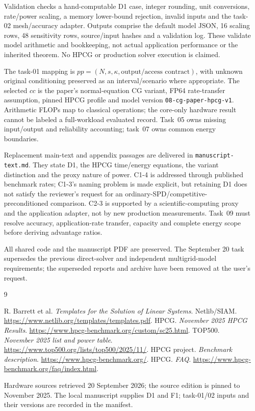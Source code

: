 \documentclass[11pt,a4paper]{article}
\begin{document}
Validation checks a hand-computable D1 case, integer rounding, unit conversions, rate/power scaling, a memory lower-bound rejection, invalid inputs and the task-02 mesh/accuracy adapter. Outputs comprise the default model JSON, 16 scaling rows, 48 sensitivity rows, source/input hashes and a validation log. These validate model arithmetic and bookkeeping, not actual application performance or the inherited theorem. No HPCG or production solver execution is claimed.

The task-01 mapping is $pp=(N,s,\kappa,\text{output/access contract})$, with unknown original conditioning preserved as an interval/scenario where appropriate. The selected $cc$ is the paper's normal-equation CG variant, FP64 rate-transfer assumption, pinned HPCG profile and model version \texttt{08-cg-paper-hpcg-v1}. Arithmetic FLOPs map to classical operations; the core-only hardware result cannot be labeled a full-workload evaluated record. Task~05 owns missing input/output and reliability accounting; task~07 owns common energy boundaries.

Replacement main-text and appendix passages are delivered in \texttt{manuscript-text.md}. They state D1, the HPCG time/energy equations, the variant distinction and the proxy nature of power. C1-4 is addressed through published benchmark rates; C1-3's naming problem is made explicit, but retaining D1 does not satisfy the reviewer's request for an ordinary-SPD/competitive-preconditioned comparison. C2-3 is supported by a scientific-computing proxy and the application adapter, not by new production measurements. Task~09 must resolve accuracy, application-rate transfer, capacity and complete energy scope before deriving advantage ratios.

All shared code and the manuscript PDF are preserved. The September 20 task supersedes the previous direct-solver and independent multigrid-model requirements; the superseded reports and archive have been removed at the user's request.

\begin{thebibliography}{9}\small\raggedright
{} R. Barrett et al. \emph{Templates for the Solution of Linear Systems}. Netlib/SIAM. \url{https://www.netlib.org/templates/templates.pdf}.
 HPCG. \emph{November 2025 HPCG Results}. \url{https://www.hpcg-benchmark.org/custom/sc25.html}.
 TOP500. \emph{November 2025 list and power table}. \url{https://www.top500.org/lists/top500/2025/11/}.
 HPCG project. \emph{Benchmark description}. \url{https://www.hpcg-benchmark.org/}.
 HPCG. \emph{FAQ}. \url{https://www.hpcg-benchmark.org/faq/index.html}.
\end{thebibliography}
Hardware sources retrieved 20 September 2026; the source edition is pinned to November 2025. The local manuscript supplies D1 and F1; task-01/02 inputs and their versions are recorded in the manifest.
\end{document}
